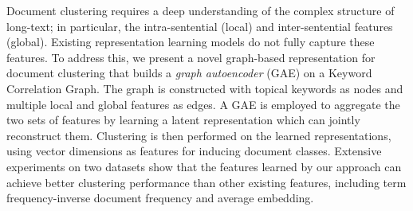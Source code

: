 Document clustering requires a deep understanding of the complex structure of long-text; in particular, the intra-sentential (local) and inter-sentential features (global). Existing representation learning models do not fully capture these features. To address this, we present a novel graph-based representation for document clustering that builds a \textit{graph autoencoder} (GAE) on a Keyword Correlation Graph. The graph is constructed with topical keywords as nodes and multiple local and global features as edges. A GAE is employed to aggregate the two sets of features by learning a latent representation which can jointly reconstruct them. Clustering is then performed on the learned representations, using vector dimensions as features for inducing document classes. Extensive experiments on two datasets show that the features learned by our approach can achieve better clustering performance than other existing features, including term frequency-inverse document frequency and average embedding.
